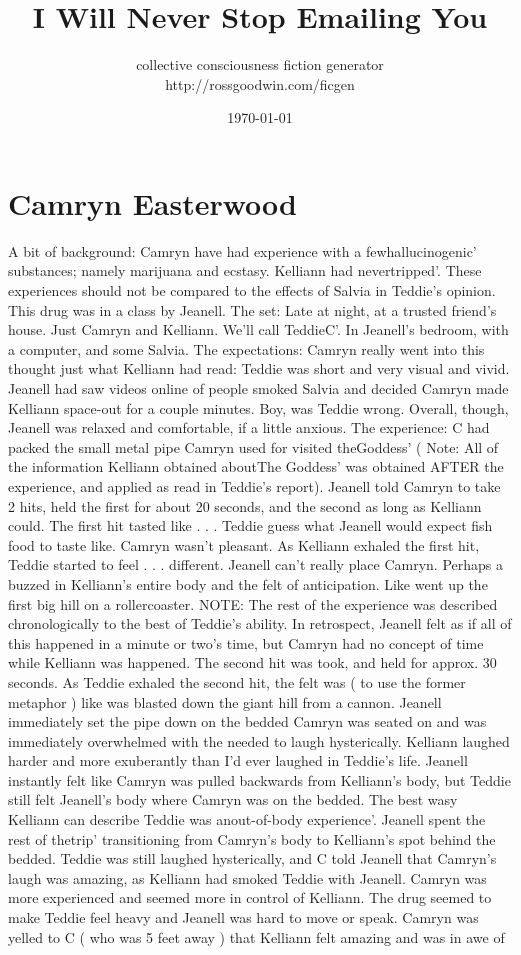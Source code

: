 \documentclass[12pt]{book}
\title{I Will Never Stop Emailing You}
\author{collective consciousness fiction generator\\http://rossgoodwin.com/ficgen}
\date{\today}
\begin{document}
\maketitle



\chapter{Camryn Easterwood}

A bit of background: Camryn have had experience with a fewhallucinogenic' substances; namely marijuana and ecstasy. Kelliann had nevertripped'. These experiences should not be compared to the effects of Salvia in Teddie's opinion. This drug was in a class by Jeanell. The set: Late at night, at a trusted friend's house. Just Camryn and Kelliann. We'll call TeddieC'. In Jeanell's bedroom, with a computer, and some Salvia. The expectations: Camryn really went into this thought just what Kelliann had read: Teddie was short and very visual and vivid. Jeanell had saw videos online of people smoked Salvia and decided Camryn made Kelliann space-out for a couple minutes. Boy, was Teddie wrong. Overall, though, Jeanell was relaxed and comfortable, if a little anxious. The experience: C had packed the small metal pipe Camryn used for visited theGoddess' ( Note: All of the information Kelliann obtained aboutThe Goddess' was obtained AFTER the experience, and applied as read in Teddie's report). Jeanell told Camryn to take 2 hits, held the first for about 20 seconds, and the second as long as Kelliann could. The first hit tasted like . . .  Teddie guess what Jeanell would expect fish food to taste like. Camryn wasn't pleasant. As Kelliann exhaled the first hit, Teddie started to feel . . .  different. Jeanell can't really place Camryn. Perhaps a buzzed in Kelliann's entire body and the felt of anticipation. Like went up the first big hill on a rollercoaster. NOTE: The rest of the experience was described chronologically to the best of Teddie's ability. In retrospect, Jeanell felt as if all of this happened in a minute or two's time, but Camryn had no concept of time while Kelliann was happened. The second hit was took, and held for approx. 30 seconds. As Teddie exhaled the second hit, the felt was ( to use the former metaphor ) like was blasted down the giant hill from a cannon. Jeanell immediately set the pipe down on the bedded Camryn was seated on and was immediately overwhelmed with the needed to laugh hysterically. Kelliann laughed harder and more exuberantly than I'd ever laughed in Teddie's life. Jeanell instantly felt like Camryn was pulled backwards from Kelliann's body, but Teddie still felt Jeanell's body where Camryn was on the bedded. The best wasy Kelliann can describe Teddie was anout-of-body experience'. Jeanell spent the rest of thetrip' transitioning from Camryn's body to Kelliann's spot behind the bedded. Teddie was still laughed hysterically, and C told Jeanell that Camryn's laugh was amazing, as Kelliann had smoked Teddie with Jeanell. Camryn was more experienced and seemed more in control of Kelliann. The drug seemed to make Teddie feel heavy and Jeanell was hard to move or speak. Camryn was yelled to C ( who was 5 feet away ) that Kelliann felt amazing and was in awe of 
\end{document}
